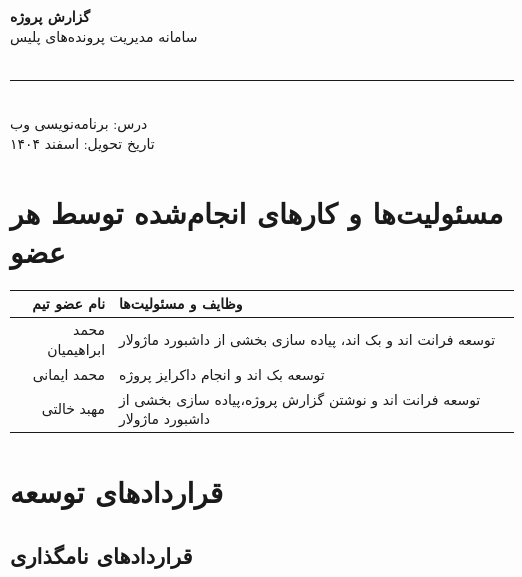 \documentclass[12pt]{article} %
\theoremstyle{definition}
\begin{document}
\begin{titlepage}
  \centering
  \vspace*{2cm}
  {\Huge\bfseries گزارش پروژه}\\[0.5cm]
  {\Large سامانه مدیریت پرونده‌های پلیس}\\[0.3cm]
  {\large {}}\\[2cm]
  \rule{\linewidth}{0.4pt}\\[1cm]
  {\large درس: برنامه‌نویسی وب}\\[0.5cm]
  {\large تاریخ تحویل: اسفند ۱۴۰۴}\\[2cm]
  \vfill
\end{titlepage}

\tableofcontents
\newpage
\section{مسئولیت‌ها و کارهای انجام‌شده توسط هر عضو}

\begin{tabular}{|r|p{8cm}|}
\hline
\textbf{نام عضو تیم} & \textbf{وظایف و مسئولیت‌ها} \\
\hline
محمد ابراهیمیان & توسعه فرانت اند و بک اند، پیاده سازی بخشی از داشبورد ماژولار \\[0.8cm]
\hline
محمد ایمانی & توسعه بک اند و انجام داکرایز پروژه\\[0.8cm]
\hline
 مهبد خالتی & توسعه فرانت اند و نوشتن گزارش پروژه،پیاده سازی بخشی از داشبورد ماژولار \\[0.8cm]
\hline
\end{tabular}

\vspace{1cm}
\section{قراردادهای توسعه}

\subsection{قراردادهای نامگذاری}
\end{document}
